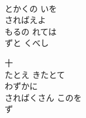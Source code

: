 \documentclass[10pt,b5j]{tarticle} %
\begin{document}
\begin{enumerate}
\begin{minipage}[c]{\blocksize}
    \end{minipage}
    \begin{minipage}[c]{\blocksize}
        
        \vspace{\linespace}
        \item~\\
        とかくの いを\\
        さればえよ \\
        もるの れては\\
        ずと くべし
        
        \vspace{\linespace}
        \item[十]~\\
        たとえ きたとて\\
        わずかに\\
        さればくさん このを\\
        ず 
    
    \end{minipage}
\end{enumerate} %
\end{document}
